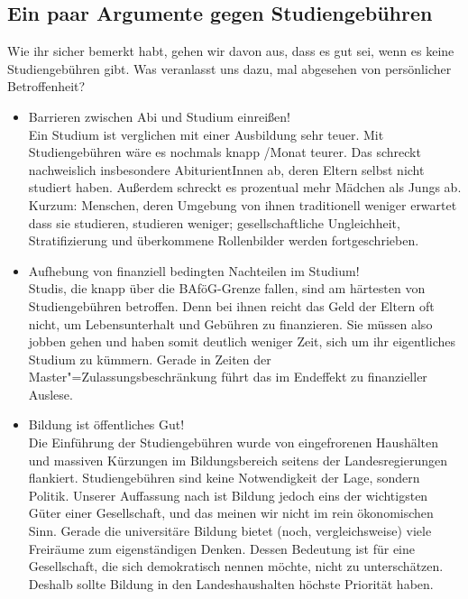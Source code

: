 \subsection*{Ein paar Argumente gegen Studiengebühren}

Wie ihr sicher bemerkt habt, gehen wir davon aus, dass es gut sei, wenn es keine Studiengebühren gibt. Was veranlasst uns dazu, mal abgesehen von persönlicher Betroffenheit?
\begin{itemize}
\item {Barrieren zwischen Abi und Studium einreißen!}\\Ein Studium ist verglichen mit einer Ausbildung sehr teuer. Mit Studiengebühren wäre es nochmals knapp /Monat teurer. Das schreckt nachweislich insbesondere AbiturientInnen ab, deren Eltern selbst nicht studiert haben. Außerdem schreckt es prozentual mehr Mädchen als Jungs ab. Kurzum: Menschen, deren Umgebung von ihnen traditionell weniger erwartet dass sie studieren, studieren weniger; gesellschaftliche Ungleichheit, Stratifizierung und überkommene Rollenbilder werden fortgeschrieben.
\item {Aufhebung von finanziell bedingten Nachteilen im Studium!}\\Studis, die knapp über die BAföG-Grenze fallen, sind am härtesten von Studiengebühren betroffen. Denn bei ihnen reicht das Geld der Eltern oft nicht, um Lebensunterhalt und Gebühren zu finanzieren. Sie müssen also jobben gehen und haben somit deutlich weniger Zeit, sich um ihr eigentliches Studium zu kümmern. Gerade in Zeiten der Master"=Zulassungsbeschränkung führt das im Endeffekt zu finanzieller Auslese.
\item {Bildung ist öffentliches Gut!}\\Die Einführung der Studiengebühren wurde von eingefrorenen Haushälten und massiven Kürzungen im Bildungsbereich seitens der Landesregierungen flankiert. Studiengebühren sind keine Notwendigkeit der Lage, sondern Politik. Unserer Auffassung nach ist Bildung jedoch eins der wichtigsten Güter einer Gesellschaft, und das meinen wir nicht im rein ökonomischen Sinn. Gerade die universitäre Bildung bietet (noch, vergleichsweise) viele Freiräume zum eigenständigen Denken. Dessen Bedeutung ist für eine Gesellschaft, die sich demokratisch nennen möchte, nicht zu unterschätzen. Deshalb sollte Bildung in den Landeshaushalten höchste Priorität haben.
\end{itemize}

